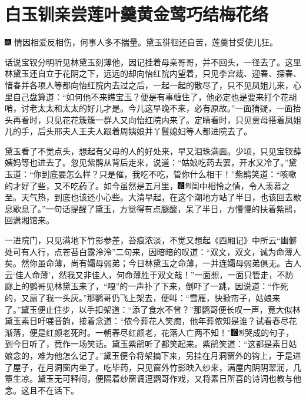 

\chapter{白玉钏亲尝莲叶羹\hspace{.5em}黄金莺巧结梅花络}

{\includegraphics[width=3mm]{../Images/00005}  \kaishu 情因相爱反相伤，何事人多不揣量。黛玉徘徊还自苦，莲羹甘受使儿狂。}

话说宝钗分明听见林黛玉刻薄他，因记挂着母亲哥哥，并不回头，一径去了。这里林黛玉还自立于花阴之下，远远的却向怡红院内望着，只见李宫裁、迎春、探春、惜春并各项人等都向怡红院内去过之后，一起一起的散尽了，只不见凤姐儿来，心里自己盘算道：``如何他不来瞧宝玉？便是有事缠住了，他必定也是要来打个花胡哨，讨老太太和太太的好儿才是。今儿这早晚不来，必有原故。''一面猜疑，一面抬头再看时，只见花花簇簇一群人又向怡红院内来了。定睛看时，只见贾母搭着凤姐儿的手，后头邢夫人王夫人跟着周姨娘并丫鬟媳妇等人都进院去了。

黛玉看了不觉点头，想起有父母的人的好处来，早又泪珠满面。少顷，只见宝钗薛姨妈等也进去了。忽见紫鹃从背后走来，说道：``姑娘吃药去罢，开水又冷了。''黛玉道：``你到底要怎么样？只是催，我吃不吃，管你什么相干！''紫鹃笑道：``咳嗽的才好了些，又不吃药了。如今虽然是五月里，{\includegraphics[width=3mm]{../Images/00006}\includegraphics[width=3mm]{../Images/00011}\footnotesize \kaishu 闺中相怜之情，令人羡慕之至。}天气热，到底也该还小心些。大清早起，在这个潮地方站了半日，也该回去歇息歇息了。''一句话提醒了黛玉，方觉得有点腿酸，呆了半日，方慢慢的扶着紫鹃，回潇湘馆来。

一进院门，只见满地下竹影参差，苔痕浓淡，不觉又想起《西厢记》中所云``幽僻处可有人行，点苍苔白露泠泠''二句来，因暗暗的叹道：``双文，双文，诚为命薄人矣。然你虽命薄，尚有孀母弱弟；今日林黛玉之命薄，一并连孀母弱弟俱无。古人云`佳人命薄'，然我又非佳人，何命薄胜于双文哉！''一面想，一面只管走，不防廊上的鹦哥见林黛玉来了，``嘎''的一声扑了下来，倒吓了一跳，因说道：``作死的，又扇了我一头灰。''那鹦哥仍飞上架去，便叫：``雪雁，快掀帘子，姑娘来了。''黛玉便止住步，以手扣架道：``添了食水不曾？''那鹦哥便长叹一声，竟大似林黛玉素日吁嗟音韵，接着念道：``侬今葬花人笑痴，他年葬侬知是谁？试看春尽花渐落，便是红颜老死时。一朝春尽红颜老，花落人亡两不知！''{\includegraphics[width=3mm]{../Images/00006}\includegraphics[width=3mm]{../Images/00011}\footnotesize \kaishu 哭成的句子，到今日听了，竟作一场笑话。}黛玉紫鹃听了都笑起来。紫鹃笑道：``这都是素日姑娘念的，难为他怎么记了。''黛玉便令将架摘下来，另挂在月洞窗外的钩上，于是进了屋子，在月洞窗内坐了。吃毕药，只见窗外竹影映入纱来，满屋内阴阴翠润，几簟生凉。黛玉无可释闷，便隔着纱窗调逗鹦哥作戏，又将素日所喜的诗词也教与他念。这且不在话下。

